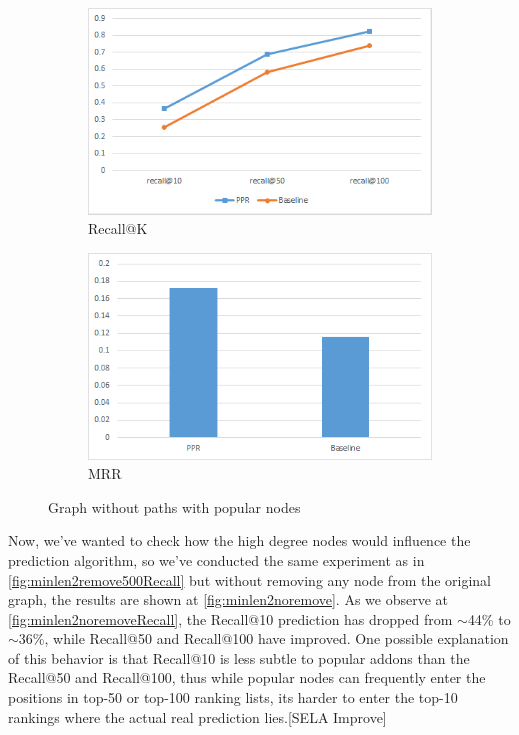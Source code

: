 \documentclass[11pt,oneside]{book}
\begin{document}
\begin{figure}[h]
\centering
\begin{subfigure}[b]{0.49\textwidth}
	\centering
\includegraphics[scale=0.49]{figures/minlen2noremove.png}
\caption{Recall@K}
\label{fig:minlen2noremoveRecall}
\end{subfigure}
\begin{subfigure}[b]{0.49\textwidth}
	\centering
\includegraphics[scale=0.49]{figures/minlen2noremoveMRR.png}
\caption{MRR}
\label{fig:minlen2noremoveMRR}
\end{subfigure}
\caption{Graph without paths with popular nodes}
	\label{fig:minlen2noremove}
\end{figure}

Now, we've wanted to check how the high degree nodes would influence the prediction algorithm, so we've conducted the same experiment as in \autoref{fig:minlen2remove500Recall} but without removing any node from the original graph, the results are shown at \autoref{fig:minlen2noremove}. As we observe at \autoref{fig:minlen2noremoveRecall}, the Recall@10 prediction has dropped from {$\sim$}44\% to {$\sim$}36\%, while Recall@50 and Recall@100 have improved. One possible explanation of this behavior is that Recall@10 is less subtle to popular addons than the Recall@50 and Recall@100, thus while popular nodes can frequently enter the positions in top-50 or top-100 ranking lists, its harder to enter the top-10 rankings where the actual real prediction lies.[SELA Improve]
\end{document}
